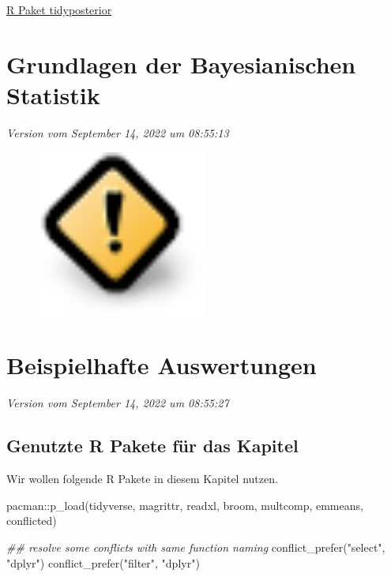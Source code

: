 \documentclass[
  letterpaper,
]{scrbook}
\newenvironment{Shaded}{\begin{snugshade}}{\end{snugshade}}
\newcommand{\DocumentationTok}[1]{\textcolor[rgb]{0.37,0.37,0.37}{\textit{#1}}}
\newcommand{\FunctionTok}[1]{\textcolor[rgb]{0.28,0.35,0.67}{#1}}
\newcommand{\NormalTok}[1]{\textcolor[rgb]{0.00,0.23,0.31}{#1}}
\newcommand{\SpecialCharTok}[1]{\textcolor[rgb]{0.37,0.37,0.37}{#1}}
\newcommand{\StringTok}[1]{\textcolor[rgb]{0.13,0.47,0.30}{#1}}
\begin{document}
\href{https://tidyposterior.tidymodels.org/}{R Paket tidyposterior}

\hypertarget{grundlagen-der-bayesianischen-statistik}{%
\chapter{Grundlagen der Bayesianischen
Statistik}\label{grundlagen-der-bayesianischen-statistik}}

\emph{Version vom September 14, 2022 um 08:55:13}

\begin{figure}

{\centering \includegraphics[width=0.5\textwidth,height=\textheight]{./images/caution.png}

}

\end{figure}

\appendix
{}

\hypertarget{sec-beispiel-auswertung}{%
\chapter{Beispielhafte Auswertungen}\label{sec-beispiel-auswertung}}

\emph{Version vom September 14, 2022 um 08:55:27}

\hypertarget{genutzte-r-pakete-fuxfcr-das-kapitel-22}{%
\section{Genutzte R Pakete für das
Kapitel}\label{genutzte-r-pakete-fuxfcr-das-kapitel-22}}

Wir wollen folgende R Pakete in diesem Kapitel nutzen.

\begin{Shaded}
\begin{Highlighting}[]
\NormalTok{pacman}\SpecialCharTok{::}\FunctionTok{p\_load}\NormalTok{(tidyverse, magrittr, readxl, }
\NormalTok{               broom, multcomp, emmeans, }
\NormalTok{               conflicted)}

\DocumentationTok{\#\# resolve some conflicts with same function naming}
\FunctionTok{conflict\_prefer}\NormalTok{(}\StringTok{"select"}\NormalTok{, }\StringTok{"dplyr"}\NormalTok{)}
\FunctionTok{conflict\_prefer}\NormalTok{(}\StringTok{"filter"}\NormalTok{, }\StringTok{"dplyr"}\NormalTok{)}
\end{Highlighting}
\end{Shaded}
\end{document}
